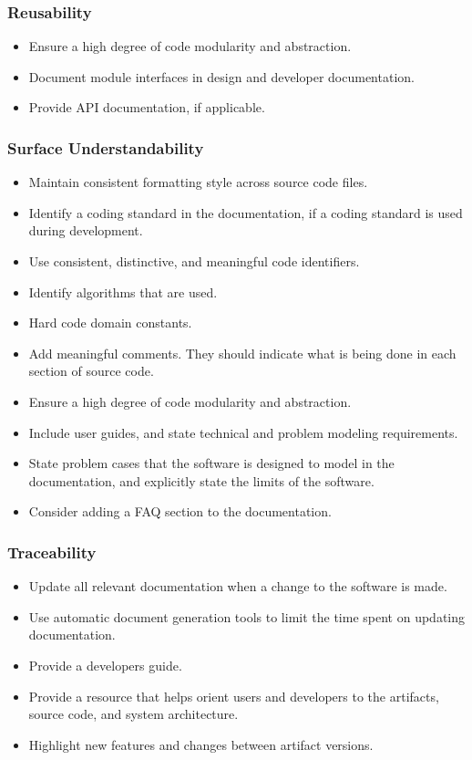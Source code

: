 \documentclass[12pt, notitlepage]{article}
\begin{document}
\subsubsection{Reusability}

\begin{itemize}
	\item Ensure a high degree of code modularity and abstraction.
	\item Document module interfaces in design and developer documentation.
	\item Provide API documentation, if applicable.
\end{itemize}

\subsubsection{Surface Understandability}

\begin{itemize}
	\item Maintain consistent formatting style across source code files.
	\item Identify a coding standard in the documentation, if a coding standard is used during development.
	\item Use consistent, distinctive, and meaningful code identifiers. 
	\item Identify algorithms that are used.
	\item Hard code domain constants.
	\item Add meaningful comments. They should indicate what is being done in each section of source code.
	\item Ensure a high degree of code modularity and abstraction.
	\item Include user guides, and state technical and problem modeling requirements.
	\item State problem cases that the software is designed to model in the documentation, and explicitly state the limits of the software. 
	\item Consider adding a FAQ section to the documentation. 
\end{itemize}

\subsubsection{Traceability}

\begin{itemize}
	\item Update all relevant documentation when a change to the software is made.
	\item Use automatic document generation tools to limit the time spent on updating documentation.
	\item Provide a developers guide.
	\item Provide a resource that helps orient users and developers to the artifacts, source code, and system architecture.
	\item Highlight new features and changes between artifact versions. 
\end{itemize}
\end{document}
